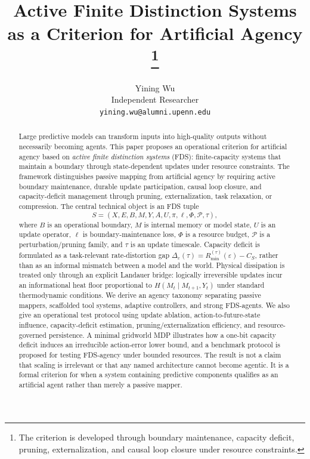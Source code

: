 \documentclass[10pt,a4paper,twocolumn,aps,prl]{revtex4-2}
\begin{document}
\title{Active Finite Distinction Systems as a Criterion for Artificial Agency%
\footnote{The criterion is developed through boundary maintenance, capacity deficit, pruning, externalization, and causal loop closure under resource constraints.}}

\author{Yining Wu\\
Independent Researcher\\
\texttt{yining.wu@alumni.upenn.edu}}

\begin{abstract}
Large predictive models can transform inputs into high-quality outputs without necessarily becoming agents. This paper proposes an operational criterion for artificial agency based on \emph{active finite distinction systems} (FDS): finite-capacity systems that maintain a boundary through state-dependent updates under resource constraints. The framework distinguishes passive mapping from artificial agency by requiring active boundary maintenance, durable update participation, causal loop closure, and capacity-deficit management through pruning, externalization, task relaxation, or compression. The central technical object is an FDS tuple
\[
S=(X,E,B,M,Y,A,U,\pi,\ell,\Phi,\mathcal{P},\tau),
\]
where $B$ is an operational boundary, $M$ is internal memory or model state, $U$ is an update operator, $\ell$ is boundary-maintenance loss, $\Phi$ is a resource budget, $\mathcal{P}$ is a perturbation/pruning family, and $\tau$ is an update timescale. Capacity deficit is formulated as a task-relevant rate-distortion gap $\Delta_{\varepsilon}(\tau)=R_{\min}^{(\tau)}(\varepsilon)-C_S$, rather than as an informal mismatch between a model and the world. Physical dissipation is treated only through an explicit Landauer bridge: logically irreversible updates incur an informational heat floor proportional to $H(M_t\mid M_{t+1},Y_t)$ under standard thermodynamic conditions. We derive an agency taxonomy separating passive mappers, scaffolded tool systems, adaptive controllers, and strong FDS-agents. We also give an operational test protocol using update ablation, action-to-future-state influence, capacity-deficit estimation, pruning/externalization efficiency, and resource-governed persistence. A minimal gridworld MDP illustrates how a one-bit capacity deficit induces an irreducible action-error lower bound, and a benchmark protocol is proposed for testing FDS-agency under bounded resources. The result is not a claim that scaling is irrelevant or that any named architecture cannot become agentic. It is a formal criterion for when a system containing predictive components qualifies as an artificial agent rather than merely a passive mapper.
\end{abstract}
\end{document}
